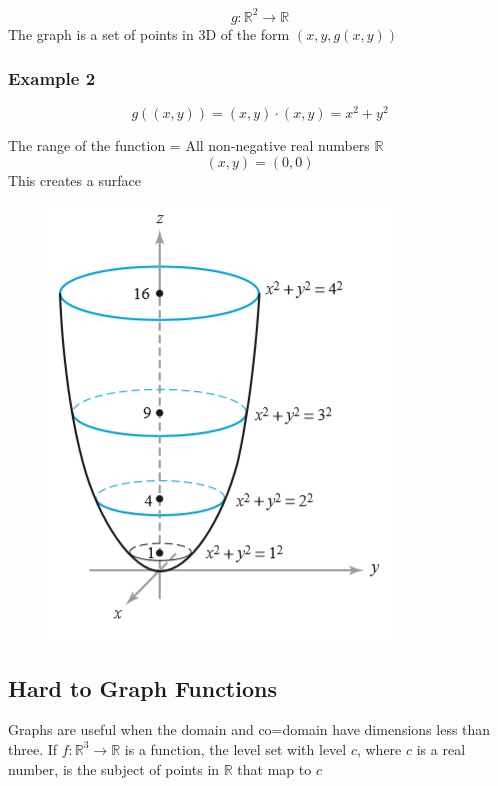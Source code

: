 \documentclass{article}
\begin{document}
\[g:\mathbb{R}^2\rightarrow\mathbb{R}\]
The graph is a set of points in 3D of the form $(x,y,g(x,y))$
\newpage
\subsubsection*{Example 2}
\[g((x,y))=(x,y)\cdot(x,y)=x^2+y^2\]

The range of the function = All non-negative real numbers $\mathbb{R}$
\[(x,y)=(0,0)\]
This creates a surface
\begin{figure}[h!]
    \centering
    \includegraphics[scale=.5]{R2toR.png}
    \caption{}
    \label{}
\end{figure}

\subsection{Hard to Graph Functions}
Graphs are useful when the domain and co=domain have dimensions less than three. If $f:\mathbb{R}^3\rightarrow\mathbb{R}$ is a function, the level set with level $c$, where $c$ is a real number, is the subject of points in $\mathbb{R}$ that map to $c$
\end{document}
